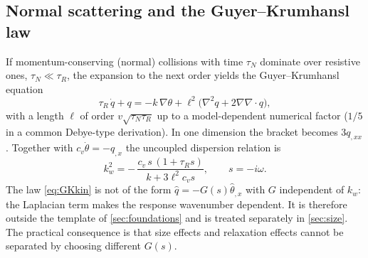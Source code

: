 \subsection{Normal scattering and the Guyer--Krumhansl law}
If momentum-conserving (normal) collisions with time $\tau_N$ dominate over resistive ones, $\tau_N\ll\tau_R$, the expansion to the next order yields the Guyer--Krumhansl equation
\begin{equation}\label{eq:GKkin}
\tau_R\,\dot q+q=-k\,\nabla\theta+\ell^{2}\bigl(\nabla^{2}q+2\nabla\nabla\!\cdot q\bigr),
\end{equation}
with a length $\ell$ of order $v\sqrt{\tau_N\tau_R}$ up to a model-dependent numerical factor ($1/5$ in a common Debye-type derivation). In one dimension the bracket becomes $3q_{,xx}$. Together with $c_v\dot\theta=-q_{,x}$ the uncoupled dispersion relation is
\begin{equation}\label{eq:GKdisp}
k_w^{2}=-\,\frac{c_v\,s\,(1+\tau_R s)}{k+3\ell^{2}c_v s},\qquad s=-i\omega .
\end{equation}
The law \cref{eq:GKkin} is not of the form $\hat q=-G(s)\hat\theta_{,x}$ with $G$ independent of $k_w$: the Laplacian term makes the response wavenumber dependent. It is therefore outside the template of \cref{sec:foundations} and is treated separately in \cref{sec:size}. The practical consequence is that size effects and relaxation effects cannot be separated by choosing different $G(s)$.


